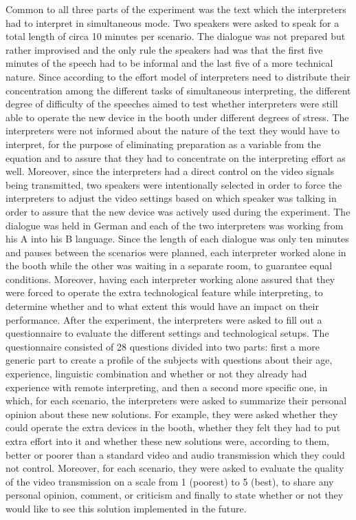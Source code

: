 \documentclass[output=paper]{langsci/langscibook}
\begin{document}
Common to all three parts of the experiment was the text which the interpreters had to interpret in simultaneous mode. Two speakers were asked to speak for a total length of circa 10 minutes per scenario. The dialogue was not prepared but rather improvised and the only rule the speakers had was that the first five minutes of the speech had to be informal and the last five of a more technical nature. Since according to the effort model of \citet{Gile2009} interpreters need to distribute their concentration among the different tasks of simultaneous interpreting, the different degree of difficulty of the speeches aimed to test whether interpreters were still able to operate the new device in the booth under different degrees of stress. The interpreters were not informed about the nature of the text they would have to interpret, for the purpose of eliminating preparation as a variable from the equation and to assure that they had to concentrate on the interpreting effort as well. Moreover, since the interpreters had a direct control on the video signals being transmitted, two speakers were intentionally selected in order to force the interpreters to adjust the video settings based on which speaker was talking in order to assure that the new device was actively used during the experiment. The dialogue was held in German and each of the two interpreters was working from his A into his B language. Since the length of each dialogue was only ten minutes and pauses between the scenarios were planned, each interpreter worked alone in the booth while the other was waiting in a separate room, to guarantee equal conditions. Moreover, having each interpreter working alone assured that they were forced to operate the extra technological feature while interpreting, to determine whether and to what extent this would have an impact on their performance. After the experiment, the interpreters were asked to fill out a questionnaire to evaluate the different settings and technological setups. The questionnaire consisted of 28 questions divided into two parts: first a more generic part to create a profile of the subjects with questions about their age, experience, linguistic combination and whether or not they already had experience with remote interpreting, and then a second more specific one, in which, for each scenario, the interpreters were asked to summarize their personal opinion about these new solutions. For example, they were asked whether they could operate the extra devices in the booth, whether they felt they had to put extra effort into it and whether these new solutions were, according to them, better or poorer than a standard video and audio transmission which they could not control. Moreover, for each scenario, they were asked to evaluate the quality of the video transmission on a scale from 1 (poorest) to 5 (best), to share any personal opinion, comment, or criticism and finally to state whether or not they would like to see this solution implemented in the future.
\end{document}
